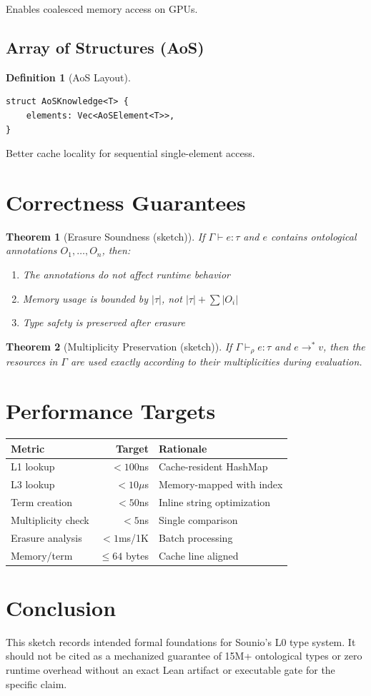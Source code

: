 \documentclass[11pt]{article}
\newtheorem{definition}{Definition}
\newtheorem{theorem}{Theorem}
\newcommand{\mult}{\rho}
\begin{document}
Enables coalesced memory access on GPUs.

\subsection{Array of Structures (AoS)}

\begin{definition}[AoS Layout]
\begin{verbatim}
struct AoSKnowledge<T> {
    elements: Vec<AoSElement<T>>,
}
\end{verbatim}
\end{definition}

Better cache locality for sequential single-element access.

\section{Correctness Guarantees}

\begin{theorem}[Erasure Soundness (sketch)]
If $\Gamma \vdash e : \tau$ and $e$ contains ontological annotations
$O_1, \ldots, O_n$, then:
\begin{enumerate}
\item The annotations do not affect runtime behavior
\item Memory usage is bounded by $|\tau|$, not $|\tau| + \sum |O_i|$
\item Type safety is preserved after erasure
\end{enumerate}
\end{theorem}

\begin{theorem}[Multiplicity Preservation (sketch)]
If $\Gamma \vdash_\mult e : \tau$ and $e \to^* v$, then the resources in
$\Gamma$ are used exactly according to their multiplicities during evaluation.
\end{theorem}

\section{Performance Targets}

\begin{center}
\begin{tabular}{|l|r|l|}
\hline
\textbf{Metric} & \textbf{Target} & \textbf{Rationale} \\
\hline
L1 lookup & $< 100$ns & Cache-resident HashMap \\
L3 lookup & $< 10\mu$s & Memory-mapped with index \\
Term creation & $< 50$ns & Inline string optimization \\
Multiplicity check & $< 5$ns & Single comparison \\
Erasure analysis & $< 1$ms/1K & Batch processing \\
Memory/term & $\leq 64$ bytes & Cache line aligned \\
\hline
\end{tabular}
\end{center}

\section{Conclusion}

This sketch records intended formal foundations for Sounio's L0 type system.
It should not be cited as a mechanized guarantee of 15M+ ontological types or
zero runtime overhead without an exact Lean artifact or executable gate for the
specific claim.
\end{document}
